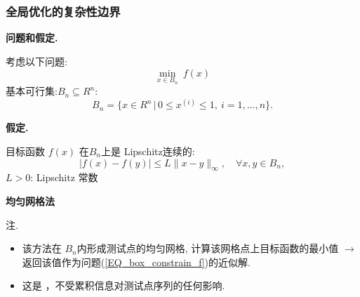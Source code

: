 \documentclass[handout]{beamer}
\begin{document}
\begin{frame}[allowframebreaks]


\frametitle{全局优化的复杂性边界}

\textbf{问题和假定.}


考虑以下问题:
\begin{equation}\label{EQ_box_constrain_f}
    \min_{x\in B_n}^{} \ f(x)
\end{equation}
基本可行集:$B_n\subseteq R^n$: 
$$
  B_n =\{x\in R^n \,|\, 0 \leq x^{(i)} \leq 1,  \ i=1,\ldots,n \}.
$$

\textbf{假定.}

目标函数 $f(x)$ 在$B_n$上是 Lipschitz连续的:
\begin{equation}\label{EQ_f_Lipschitz}
    |f(x) - f(y)| \leq L \|x-y\|_{\infty}^{}, \quad \forall x,y \in B_n,
\end{equation}
  $L>0$: Lipschitz 常数 


\framebreak

\textbf{均匀网格法}





\framebreak

注.

\begin{itemize}
\item 该方法在  $B_n$内形成测试点的均匀网格,
    计算该网格点上目标函数的最小值 $\rightarrow$返回该值作为问题(\ref{EQ_box_constrain_f})的近似解.
\item 这是 ，不受累积信息对测试点序列的任何影响.
\end{itemize}


\end{frame}
\end{document}

